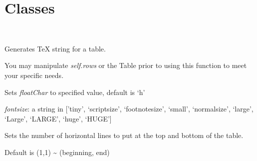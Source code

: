 \documentclass[letterpaper,10pt,english]{sphinxmanual}
\begin{document}
\section{Classes}
\label{summary:classes}

\begin{fulllineitems}
\label{summary:tablemaker.Table}~

\begin{fulllineitems}
\label{summary:tablemaker.Table.makeTex}
Generates TeX string for a table.

You may manipulate \emph{self.rows} or the Table prior to using this
function to meet your specific needs.

\end{fulllineitems}


\begin{fulllineitems}
\label{summary:tablemaker.Table.setFloat}
Sets \emph{floatChar} to specified value, default is `h'

\end{fulllineitems}


\begin{fulllineitems}
\label{summary:tablemaker.Table.setFontSize}
\emph{fontsize}: a string in {[}'tiny', `scriptsize', `footnotesize', `small', `normalsize',
`large', `Large', `LARGE', `huge', `HUGE'{]}

\end{fulllineitems}


\begin{fulllineitems}
\label{summary:tablemaker.Table.setHlines}
Sets the number of horizontal lines to put at the 
top and bottom of the table.

Default is (1,1) \textasciitilde{} (beginning, end)


\end{fulllineitems}
\end{fulllineitems}
\end{document}
